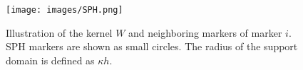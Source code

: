 \begin{figure}
	\begin{center}
		\texttt{[image: images/SPH.png]}
	\end{center}
	\caption{Illustration of the kernel $W$ and neighboring markers of marker $i$. SPH markers are shown as small circles. The radius of the support domain is defined as $\kappa h$.}
	\label{fig:SPH_Kernel}
\end{figure}